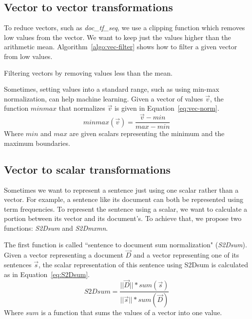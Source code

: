 \subsection{Vector to vector transformations}

To reduce vectors, such as \textit{doc\_tf\_seq}, we use a clipping function which removes low values from the vector. 
We want to keep just the values higher than the arithmetic mean. 
Algorithm~\ref{algo:vec-filter} shows how to filter a given vector from low values.
\begin{algorithm}[!ht]
	\caption{Filtering vectors by removing values less than the mean.}
	\label{algo:vec-filter}
\end{algorithm}

Sometimes, setting values into a standard range, such as using min-max normalization, can help machine learning. 
Given a vector of values $ \overrightarrow{v} $, the function $ minmax $ that normalizes $ \overrightarrow{v} $ is given in Equation~\ref{eq:vec-norm}. 
\begin{equation}
\label{eq:vec-norm}
minmax(\overrightarrow{v}) = \frac{\overrightarrow{v} - min}{max - min}
\end{equation}
Where $ min $ and $ max $ are given scalars representing the minimum and the maximum boundaries.

\subsection{Vector to scalar transformations}

Sometimes we want to represent a sentence just using one scalar rather than a vector. 
For example, a sentence like its document can both be represented using term frequencies. 
To represent the sentence using a scalar, we want to calculate a portion between its vector and its document's. 
To achieve that, we propose two functions: \textit{S2Dsum} and \textit{S2Dmxmn}.

The first function is called ``sentence to document sum normalization" (\textit{S2Dsum}). 
Given a vector representing a document $ \overrightarrow{D} $ and a vector representing one of its sentences $ \overrightarrow{s} $, the scalar representation of this sentence using S2Dsum is calculated as in Equation~\ref{eq:S2Dsum}.
%
\begin{equation}
\label{eq:S2Dsum}
S2Dsum = \frac{||\overrightarrow{D}|| * sum(\overrightarrow{s})}{||\overrightarrow{s}|| * sum(\overrightarrow{D})}
\end{equation}
Where $ sum $ is a function that sums the values of a vector into one value.


